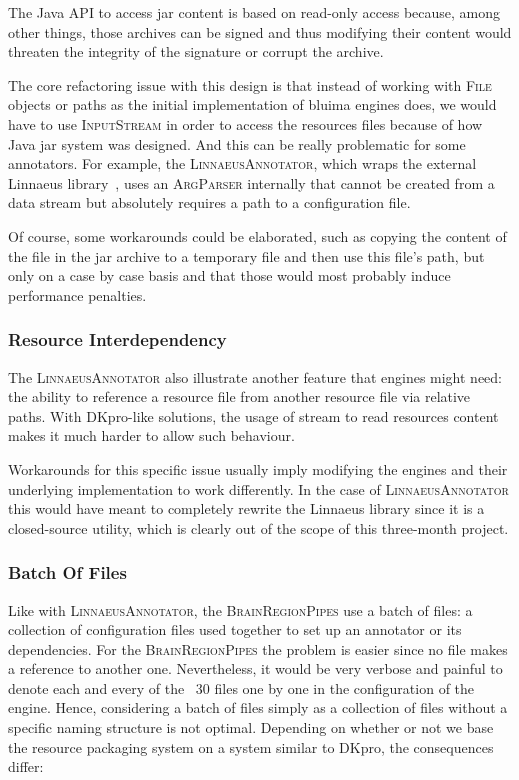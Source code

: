 \documentclass{article}
\newcommand{\ID}[1]{{\textsc{#1}}}
\begin{document}
The Java API to access jar content is based on read-only access because, among other things, those
archives can be signed and thus modifying their content would threaten the integrity of the
signature or corrupt the archive.

The core refactoring issue with this design is that instead of working with \ID{File} objects or
paths as the initial implementation of bluima engines does, we would have to use \ID{InputStream} in
order to access the resources files because of how Java jar system was designed. And this can be
really problematic for some annotators. For example, the \ID{LinnaeusAnnotator}, which wraps the
external Linnaeus library~\cite{linnaeus}, uses an \ID{ArgParser} internally that cannot be created
from a data stream but absolutely requires a path to a configuration file.

Of course, some workarounds could be elaborated, such as copying the content of the file in the jar
archive to a temporary file and then use this file's path, but only on a case by case basis and that
those would most probably induce performance penalties.

\subsubsection{Resource Interdependency}

The \ID{LinnaeusAnnotator} also illustrate another feature that engines might need: the ability to
reference a resource file from another resource file via relative paths. With DKpro-like solutions,
the usage of stream to read resources content makes it much harder to allow such behaviour.

Workarounds for this specific issue usually imply modifying the engines and their underlying
implementation to work differently. In the case of \ID{Linnaeus\-Annotator} this would have meant to
completely rewrite the Linnaeus library since it is a closed-source utility, which is clearly out of
the scope of this three-month project.

\subsubsection{Batch Of Files}

Like with \ID{LinnaeusAnnotator}, the \ID{BrainRegionPipes} use a batch of files: a collection of
configuration files used together to set up an annotator or its dependencies. For the
\ID{BrainRegionPipes} the problem is easier since no file makes a reference to another one.
Nevertheless, it would be very verbose and painful to denote each and every of the ~30 files one by
one in the configuration of the engine. Hence, considering a batch of files simply as a collection
of files without a specific naming structure is not optimal. Depending on whether or not we base the
resource packaging system on a system similar to DKpro, the consequences differ:
\end{document}
